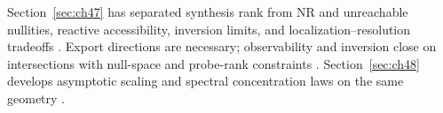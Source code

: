 
Section~\ref{sec:ch47} has separated synthesis rank from NR and unreachable nullities, reactive accessibility, inversion limits, and
localization--resolution tradeoffs \cite{stratton1941,harrington2001,devaney2004,hansen1988}. Export directions are necessary; observability and
inversion close on intersections with null-space and probe-rank constraints \cite{stratton1941}. Section~\ref{sec:ch48} develops asymptotic scaling
and spectral concentration laws on the same geometry \cite{jackson1999,hansen1988,harrington2001}.

